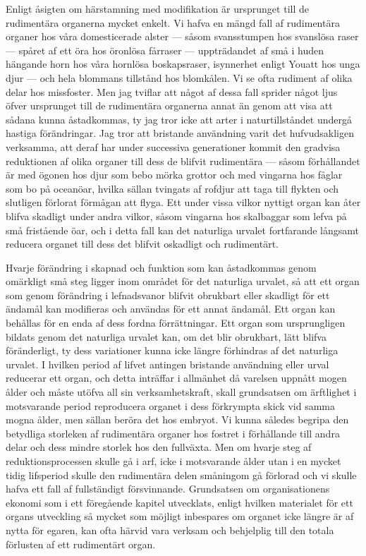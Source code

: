 Enligt åsigten om härstamning med modifikation är ursprunget till de rudimentära organerna mycket enkelt. Vi hafva en mängd fall af rudimentära organer hos våra domesticerade alster — såsom svansstumpen hos svanslösa raser — spåret af ett öra hos öronlösa fårraser — uppträdandet af små i huden hängande horn hos våra hornlösa boskapsraser, isynnerhet enligt Youatt hos unga djur — och hela blommans tillstånd hos blomkålen. Vi se ofta rudiment af olika delar hos missfoster. Men jag tviflar att något af dessa fall sprider något ljus öfver ursprunget till de rudimentära organerna annat än genom att visa att sådana kunna åstadkommas, ty jag tror icke att arter i naturtillståndet undergå hastiga förändringar. Jag tror att bristande användning varit det hufvudsakligen verksamma, att deraf har under successiva generationer kommit den gradvisa reduktionen af olika organer till dess de blifvit rudimentära — såsom förhållandet är med ögonen hos djur som bebo mörka grottor och med vingarna hos fåglar som bo på oceanöar, hvilka sällan tvingats af rofdjur att taga till flykten och slutligen förlorat förmågan att flyga. Ett under vissa vilkor nyttigt organ kan åter blifva skadligt under andra vilkor, såsom vingarna hos skalbaggar som lefva på små fristående öar, och i detta fall kan det naturliga urvalet fortfarande långsamt reducera organet till dess det blifvit oskadligt och rudimentärt.

Hvarje förändring i skapnad och funktion som kan åstadkommas genom omärkligt små steg ligger inom området för det naturliga urvalet, så att ett organ som genom förändring i lefnadsvanor blifvit obrukbart eller skadligt för ett ändamål kan modifieras och användas för ett annat ändamål. Ett organ kan behållas för en enda af dess fordna förrättningar. Ett organ som ursprungligen bildats genom det naturliga urvalet kan, om det blir obrukbart, lätt blifva föränderligt, ty dess variationer kunna icke längre förhindras af det naturliga urvalet. I hvilken period af lifvet antingen bristande användning eller urval reducerar ett organ, och detta inträffar i allmänhet då varelsen uppnått mogen ålder och måste utöfva all sin verksamhetskraft, skall grundsatsen om ärftlighet i motsvarande period reproducera organet i dess förkrympta skick vid samma mogna ålder, men sällan beröra det hos embryot. Vi kunna således begripa den betydliga storleken af rudimentära organer hos fostret i förhållande till andra delar och dess mindre storlek hos den fullväxta. Men om hvarje steg af reduktionsprocessen skulle gå i arf, icke i motsvarande ålder utan i en mycket tidig lifsperiod skulle den rudimentära delen småningom gå förlorad och vi skulle hafva ett fall af fullständigt försvinnande. Grundsatsen om organisationens ekonomi som i ett föregående kapitel utvecklats, enligt hvilken materialet för ett organs utveckling så mycket som möjligt inbespares om organet icke längre är af nytta för egaren, kan ofta härvid vara verksam och behjelplig till den totala förlusten af ett rudimentärt organ.

